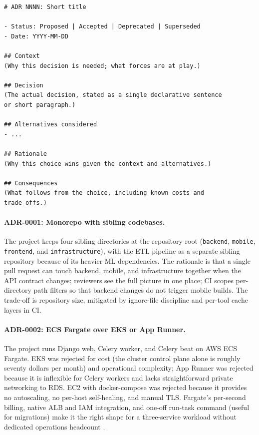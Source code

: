 \begin{lstlisting}[caption={ADR template used by the project.},label={lst:adr-template}]
# ADR NNNN: Short title

- Status: Proposed | Accepted | Deprecated | Superseded
- Date: YYYY-MM-DD

## Context
(Why this decision is needed; what forces are at play.)

## Decision
(The actual decision, stated as a single declarative sentence
or short paragraph.)

## Alternatives considered
- ...

## Rationale
(Why this choice wins given the context and alternatives.)

## Consequences
(What follows from the choice, including known costs and
trade-offs.)
\end{lstlisting}

\paragraph{ADR-0001: Monorepo with sibling codebases.} The project keeps four sibling directories at the repository root (\texttt{backend}, \texttt{mobile}, \texttt{frontend}, and \texttt{infrastructure}), with the ETL pipeline as a separate sibling repository because of its heavier ML dependencies. The rationale is that a single pull request can touch backend, mobile, and infrastructure together when the API contract changes; reviewers see the full picture in one place; CI scopes per-directory path filters so that backend changes do not trigger mobile builds. The trade-off is repository size, mitigated by ignore-file discipline and per-tool cache layers in CI.

\paragraph{ADR-0002: ECS Fargate over EKS or App Runner.} The project runs Django web, Celery worker, and Celery beat on AWS ECS Fargate. EKS was rejected for cost (the cluster control plane alone is roughly seventy dollars per month) and operational complexity; App Runner was rejected because it is inflexible for Celery workers and lacks straightforward private networking to RDS. EC2 with docker-compose was rejected because it provides no autoscaling, no per-host self-healing, and manual TLS. Fargate's per-second billing, native ALB and IAM integration, and one-off run-task command (useful for migrations) make it the right shape for a three-service workload without dedicated operations headcount \cite{burns2016}.

